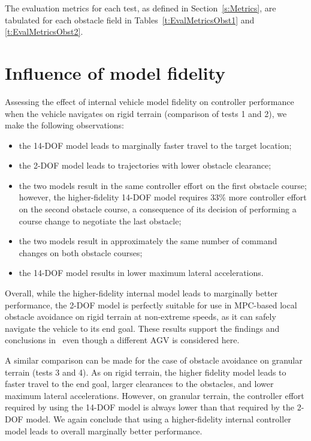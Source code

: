 \documentclass[12pt,onecolumn]{report}
\begin{document}
The evaluation metrics for each test, as defined in Section~\ref{s:Metrics}, are tabulated for each obstacle field in Tables~\ref{t:EvalMetricsObst1} and \ref{t:EvalMetricsObst2}. 

\section{Influence of model fidelity}

Assessing the effect of internal vehicle model fidelity on controller performance when the vehicle navigates on rigid terrain (comparison of tests 1 and 2), we make the following observations:
\begin{itemize}
\item the 14-DOF model leads to marginally faster travel to the target location;
\item the 2-DOF model leads to trajectories with lower obstacle clearance;
\item the two models result in the same controller effort on the first obstacle course; however, the higher-fidelity 14-DOF model requires 33\% more controller effort on the second obstacle course, a consequence of its decision of performing a course change to negotiate the last obstacle;
\item the two models result in approximately the same number of command changes on both obstacle courses;
\item the 14-DOF model results in lower maximum lateral accelerations.
\end{itemize}

Overall, while the higher-fidelity internal model leads to marginally better performance, the 2-DOF model is perfectly suitable for use in MPC-based local obstacle avoidance on rigid terrain at non-extreme speeds, as it can safely navigate the vehicle to its end goal. These results support the findings and conclusions in~\cite{ModelFidelity2016} even though a different AGV is considered here.

A similar comparison can be made for the case of obstacle avoidance on granular terrain (tests 3 and 4).  As on rigid terrain, the higher fidelity model leads to faster travel to the end goal, larger clearances to the obstacles, and lower maximum lateral accelerations.  However, on granular terrain, the controller effort required by using the 14-DOF model is always lower than that required by the 2-DOF model.  We again conclude that using a higher-fidelity internal controller model leads to overall marginally better performance.
\end{document}
